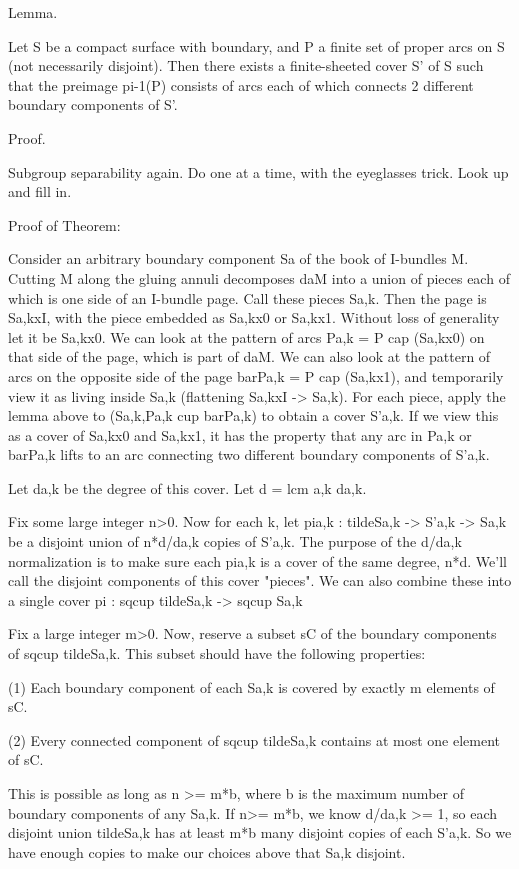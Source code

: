 \documentclass[12pt]{amsart}
\theoremstyle{definition}
\theoremstyle{remark}
\begin{document}
Lemma.

Let S be a compact surface with boundary, and P a finite set of proper arcs on
S (not necessarily disjoint).  Then there exists a finite-sheeted cover S' of
S such that the preimage pi-1(P) consists of arcs each of which connects
2 different boundary components of S'.

Proof.

Subgroup separability again. Do one at a time, with the eyeglasses trick.  Look
up and fill in.

Proof of Theorem:

Consider an arbitrary boundary component Sa of the book of I-bundles M.
Cutting M along the gluing annuli decomposes daM into a union of pieces each of
which is one side of an I-bundle page. Call these pieces Sa,k. Then the page is
Sa,kxI, with the piece embedded as Sa,kx0 or Sa,kx1. Without loss of generality
let it be Sa,kx0. We can look at the pattern of arcs Pa,k = P cap (Sa,kx0) on
that side of the page, which is part of daM. We can also look at the pattern of
arcs on the opposite side of the page barPa,k = P cap (Sa,kx1), and temporarily
view it as living inside Sa,k (flattening Sa,kxI -> Sa,k).  For each piece,
apply the lemma above to (Sa,k,Pa,k cup barPa,k) to obtain a cover S'a,k. If we
view this as a cover of Sa,kx0 and Sa,kx1, it has the property that any arc in
Pa,k or barPa,k lifts to an arc connecting two different boundary components of
S'a,k.

Let da,k be the degree of this cover. Let d = lcm a,k da,k.

Fix some large integer n>0. Now for each k, let pia,k : tildeSa,k -> S'a,k ->
Sa,k be a disjoint union of n*d/da,k copies of S'a,k. The purpose of the d/da,k
normalization is to make sure each pia,k is a cover of the same degree, n*d.
We'll call the disjoint components of this cover "pieces". We can also combine
these into a single cover pi : sqcup tildeSa,k -> sqcup Sa,k

Fix a large integer m>0. Now, reserve a subset sC of the boundary components of
sqcup tildeSa,k.  This subset should have the following properties:

(1) Each boundary component of each Sa,k is covered by exactly m elements of
sC.

(2) Every connected component of sqcup tildeSa,k contains at most one element
of sC.

This is possible as long as n >= m*b, where b is the maximum number of boundary
components of any Sa,k. If n>= m*b, we know d/da,k >= 1, so each disjoint union
tildeSa,k has at least m*b many disjoint copies of each S'a,k. So we have
enough copies to make our choices above that Sa,k disjoint.
\end{document}
